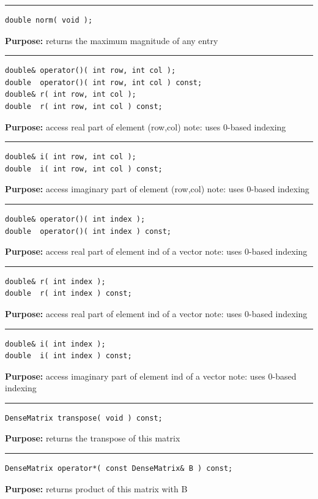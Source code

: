 \documentclass{article}
\begin{document}
\hspace{-.21in}\rule{5in}{1pt}
\begin{verbatim}
double norm( void );
\end{verbatim}
\textbf{Purpose:}
returns the maximum magnitude of any entry

\hspace{-.21in}\rule{5in}{1pt}
\begin{verbatim}
double& operator()( int row, int col );
double  operator()( int row, int col ) const;
double& r( int row, int col );
double  r( int row, int col ) const;
\end{verbatim}
\textbf{Purpose:}
access real part of element (row,col)
note: uses 0-based indexing

\hspace{-.21in}\rule{5in}{1pt}
\begin{verbatim}
double& i( int row, int col );
double  i( int row, int col ) const;
\end{verbatim}
\textbf{Purpose:}
access imaginary part of element (row,col)
note: uses 0-based indexing

\hspace{-.21in}\rule{5in}{1pt}
\begin{verbatim}
double& operator()( int index );
double  operator()( int index ) const;
\end{verbatim}
\textbf{Purpose:}
access real part of element ind of a vector
note: uses 0-based indexing

\hspace{-.21in}\rule{5in}{1pt}
\begin{verbatim}
double& r( int index );
double  r( int index ) const;
\end{verbatim}
\textbf{Purpose:}
access real part of element ind of a vector
note: uses 0-based indexing

\hspace{-.21in}\rule{5in}{1pt}
\begin{verbatim}
double& i( int index );
double  i( int index ) const;
\end{verbatim}
\textbf{Purpose:}
access imaginary part of element ind of a vector
note: uses 0-based indexing

\hspace{-.21in}\rule{5in}{1pt}
\begin{verbatim}
DenseMatrix transpose( void ) const;
\end{verbatim}
\textbf{Purpose:}
returns the transpose of this matrix

\hspace{-.21in}\rule{5in}{1pt}
\begin{verbatim}
DenseMatrix operator*( const DenseMatrix& B ) const;
\end{verbatim}
\textbf{Purpose:}
returns product of this matrix with B
\end{document}
